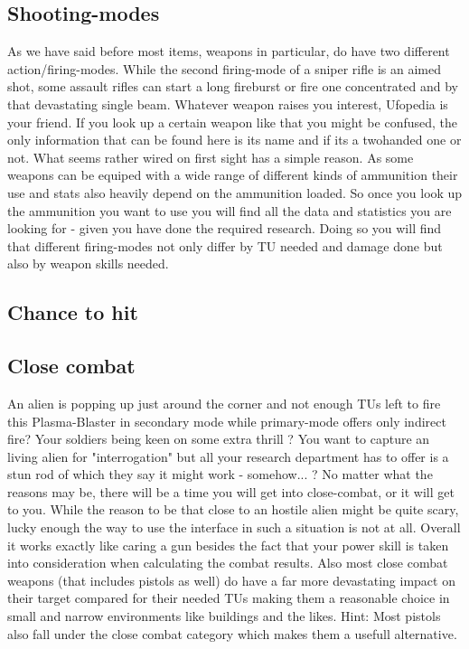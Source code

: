 \subsection{Shooting-modes}
As we have said before most items, weapons in particular, do have two different action/firing-modes. While the second firing-mode of a sniper rifle is an aimed shot, some assault rifles can start a long fireburst or fire one concentrated and by that devastating single beam. Whatever weapon raises you interest, Ufopedia is your friend. If you look up a certain weapon like that you might be confused, the only information that can be found here is its name and if its a twohanded one or not. What seems rather wired on first sight has a simple reason. As some weapons can be equiped with a wide range of different kinds of ammunition their use and stats also heavily depend on the ammunition loaded. So once you look up the ammunition you want to use you will find all the data and statistics you are looking for - given you have done the required research. Doing so you will find that different firing-modes not only differ by TU needed and damage done but also by weapon skills needed.
\subsection{Chance to hit}



\subsection{Close combat }
An alien is popping up just around the corner and not enough TUs left to fire this Plasma-Blaster in secondary mode while primary-mode offers only indirect fire? Your soldiers being keen on some extra thrill ? You want to capture an living alien for "interrogation"   but all your research department has to offer is a stun rod of which they say it might work - somehow... ? No matter what the reasons may be, there will be a time you will get into close-combat, or it will get to you. While the reason to be that close to an hostile alien might be quite scary, lucky enough the way to use the interface in such a situation is not at all. Overall it works exactly like caring a gun besides the fact that your power skill is taken into consideration when calculating the combat results. Also most close combat weapons (that includes pistols as well) do have a far more devastating impact on their target compared for their needed TUs making them a reasonable choice in small and narrow environments like buildings and the likes. Hint: Most pistols also fall under the close combat category which makes them a usefull alternative.

